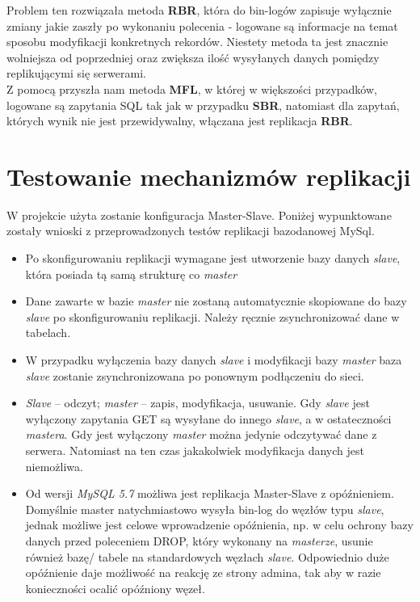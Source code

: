 Problem ten rozwiązała metoda \textbf{RBR}, która do bin-logów zapisuje wyłącznie zmiany jakie zaszły
po wykonaniu polecenia - logowane są informacje na temat sposobu modyfikacji konkretnych
rekordów. Niestety metoda ta jest znacznie wolniejsza od poprzedniej oraz zwiększa ilość
wysyłanych danych pomiędzy replikującymi się serwerami.\\

Z pomocą przyszła nam metoda \textbf{MFL}, w której w większości przypadków, logowane są zapytania
SQL tak jak w przypadku \textbf{SBR}, natomiast dla zapytań, których wynik nie jest przewidywalny,
włączana jest replikacja \textbf{RBR}.\\

\section{Testowanie mechanizmów replikacji}
\label{chap:testReplikacji}

W projekcie użyta zostanie konfiguracja Master-Slave. Poniżej wypunktowane zostały wnioski z przeprowadzonych testów replikacji bazodanowej MySql.

\begin{itemize}
	\item Po skonfigurowaniu replikacji wymagane jest utworzenie bazy danych \textit{slave}, która posiada
	tą samą strukturę co \textit{master}
	\item Dane zawarte w bazie \textit{master} nie zostaną automatycznie skopiowane do bazy \textit{slave} po
	skonfigurowaniu replikacji. Należy ręcznie zsynchronizować dane w tabelach.
	\item W przypadku wyłączenia bazy danych \textit{slave} i modyfikacji bazy \textit{master} baza \textit{slave} zostanie
	zsynchronizowana po ponownym podłączeniu do sieci.
	\item \textit{Slave} – odczyt; \textit{master} – zapis, modyfikacja, usuwanie. Gdy \textit{slave} jest wyłączony zapytania
	GET są wysyłane do innego \textit{slave}, a w ostateczności \textit{mastera}. Gdy jest wyłączony \textit{master}
	można jedynie odczytywać dane z serwera. Natomiast na ten czas jakakolwiek modyfikacja
	danych jest niemożliwa.
	\item Od wersji\textit{ MySQL 5.7} możliwa jest replikacja Master-Slave z opóźnieniem. Domyślnie master natychmiastowo wysyła bin-log do węzłów typu \textit{slave}, jednak możliwe jest celowe wprowadzenie opóźnienia, np. w celu ochrony bazy danych przed poleceniem DROP, który wykonany na \textit{masterze}, usunie również bazę/ tabele na standardowych węzłach \textit{slave}. Odpowiednio duże opóźnienie daje możliwość na reakcję ze strony admina, tak aby w razie konieczności ocalić opóźniony węzeł.
\end{itemize}



